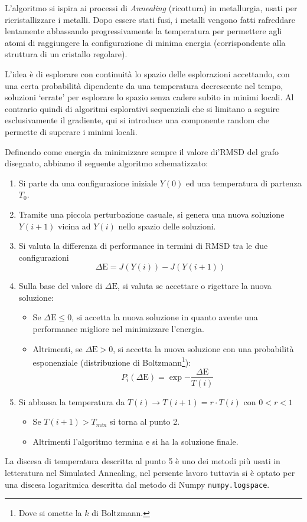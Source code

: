 \documentclass[10pt,a4paper]{article}
\newcommand{\E}{\mathrm{E}}
\begin{document}
L'algoritmo si ispira ai processi di \textit{Annealing} (ricottura) in metallurgia, usati per ricristallizzare i metalli. Dopo essere stati fusi, i metalli vengono fatti rafreddare lentamente abbassando progressivamente la temperatura per permettere agli atomi di raggiungere la configurazione di minima energia (corrispondente alla struttura di un cristallo regolare).

L'idea è di esplorare con continuità lo spazio delle esplorazioni accettando, con una certa probabilità dipendente da una temperatura decrescente nel tempo, soluzioni `errate' per esplorare lo spazio senza cadere subito in minimi locali.
Al contrario quindi di algoritmi esplorativi sequenziali che si limitano a seguire esclusivamente il gradiente, qui si introduce una componente random che permette di superare i minimi locali.

Definendo come energia da minimizzare sempre il valore di'RMSD del grafo disegnato, abbiamo il seguente algoritmo schematizzato:
\begin{enumerate}
    \item Si parte da una configurazione iniziale \(Y(0)\) ed una temperatura di partenza \(T_0\).
    \item Tramite una piccola perturbazione casuale, si genera una nuova soluzione \(Y(i + 1)\) vicina ad \(Y(i)\) nello spazio delle soluzioni.
    \item Si valuta la differenza di performance in termini di RMSD tra le due configurazioni
    \begin{equation}
        \Delta \E = J(Y(i)) - J(Y(i + 1))
    \end{equation}
    \item Sulla base del valore di \(\Delta \E \), si valuta se accettare o rigettare la nuova soluzione:
    \begin{itemize}
        \item Se \(\Delta \E \leq 0\), si accetta la nuova soluzione in quanto avente una performance migliore nel minimizzare l'energia.
        \item Altrimenti, se \(\Delta \E > 0\), si accetta la nuova soluzione con una probabilità esponenziale (distribuzione di Boltzmann\footnote{Dove si omette la \(k\) di Boltzmann.}):
        \begin{equation}
            P_i(\Delta\E) = \exp{-\frac{\Delta\E}{T(i)}}
        \end{equation} 
    \end{itemize}
    \item Si abbassa la temperatura da \(T(i) \rightarrow T(i + 1) = r\cdot T(i)\) con \(0 < r < 1\)
    \begin{itemize}
        \item Se \(T(i + 1) > T_{min}\) si torna al punto 2.
        \item Altrimenti l'algoritmo termina e si ha la soluzione finale.    
    \end{itemize}
\end{enumerate}
La discesa di temperatura descritta al punto 5 è uno dei metodi più usati in letteratura nel Simulated Annealing, nel persente lavoro tuttavia si è optato per una discesa logaritmica descritta dal metodo di Numpy \lstinline{numpy.logspace}.
\end{document}
